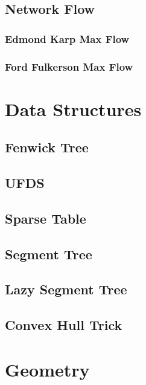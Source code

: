 \documentclass[twocolumn]{article}
\begin{document}
    \subsection{Network Flow}
        \subsubsection{Edmond Karp Max Flow}
        
        \subsubsection{Ford Fulkerson Max Flow}
        

    \newpage
    \section{Data Structures}
        \subsection{Fenwick Tree}
        
        \subsection{UFDS}
        
        \subsection{Sparse Table}
        
        \subsection{Segment Tree}
        
        \subsection{Lazy Segment Tree}
        
        \subsection{Convex Hull Trick}
        

    \newpage
    \section{Geometry}
\end{document}
